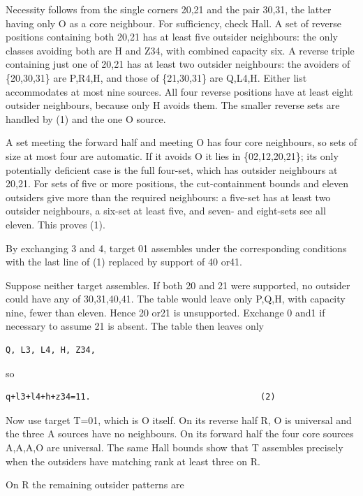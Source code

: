 \documentclass[
  10pt,
]{article}
\begin{document}
Necessity follows from the single corners 20,21 and the pair 30,31, the
latter having only O as a core neighbour. For sufficiency, check Hall. A
set of reverse positions containing both 20,21 has at least five
outsider neighbours: the only classes avoiding both are H and Z34, with
combined capacity six. A reverse triple containing just one of 20,21 has
at least two outsider neighbours: the avoiders of \{20,30,31\} are
P,R4,H, and those of \{21,30,31\} are Q,L4,H. Either list accommodates
at most nine sources. All four reverse positions have at least eight
outsider neighbours, because only H avoids them. The smaller reverse
sets are handled by (1) and the one O source.

A set meeting the forward half and meeting O has four core neighbours,
so sets of size at most four are automatic. If it avoids O it lies in
\{02,12,20,21\}; its only potentially deficient case is the full
four-set, which has outsider neighbours at 20,21. For sets of five or
more positions, the cut-containment bounds and eleven outsiders give
more than the required neighbours: a five-set has at least two outsider
neighbours, a six-set at least five, and seven- and eight-sets see all
eleven. This proves (1).

By exchanging 3 and 4, target 01 assembles under the
corresponding conditions with the last line of (1) replaced by support
of 40 or41.

Suppose neither target assembles. If both 20 and 21 were supported, no
outsider could have any of 30,31,40,41. The table would leave only
P,Q,H, with capacity nine, fewer than eleven. Hence 20 or21 is
unsupported. Exchange 0 and1 if necessary to assume 21 is absent. The
table then leaves only

\begin{verbatim}
Q, L3, L4, H, Z34,
\end{verbatim}

so

\begin{verbatim}
q+l3+l4+h+z34=11.                                  (2)
\end{verbatim}

Now use target T=01, which is O itself. On its reverse half R,
O is universal and the three A sources have no neighbours. On its
forward half the four core sources A,A,A,O are universal. The same Hall
bounds show that T assembles precisely when the outsiders have matching
rank at least three on R.

On R the remaining outsider patterns are
\end{document}
